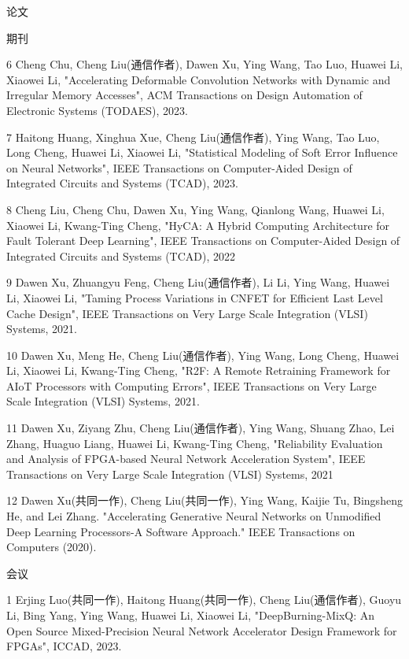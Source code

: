 \documentclass{resume} %
\begin{document}
\begin{rSection}{论文}
\begin{rSubsection} {期刊}{}{}{}
    \item 6 Cheng Chu, Cheng Liu(通信作者), Dawen Xu, Ying Wang, Tao Luo, Huawei Li, Xiaowei Li, "Accelerating Deformable Convolution Networks with Dynamic and Irregular Memory Accesses", ACM Transactions on Design Automation of Electronic Systems (TODAES), 2023.

    \item 7 Haitong Huang, Xinghua Xue, Cheng Liu(通信作者), Ying Wang, Tao Luo, Long Cheng, Huawei Li, Xiaowei Li, "Statistical Modeling of Soft Error Influence on Neural Networks", IEEE Transactions on Computer-Aided Design of Integrated Circuits and Systems (TCAD), 2023.

    \item 8 Cheng Liu, Cheng Chu, Dawen Xu, Ying Wang, Qianlong Wang, Huawei Li, Xiaowei Li, Kwang-Ting Cheng, "HyCA: A Hybrid Computing Architecture for Fault Tolerant Deep Learning", IEEE Transactions on Computer-Aided Design of Integrated Circuits and Systems (TCAD), 2022

    \item 9 Dawen Xu, Zhuangyu Feng, Cheng Liu(通信作者), Li Li, Ying Wang, Huawei Li, Xiaowei Li, "Taming Process Variations in CNFET for Efficient Last Level Cache Design", IEEE Transactions on Very Large Scale Integration (VLSI) Systems, 2021.

    \item 10 Dawen Xu, Meng He, Cheng Liu(通信作者), Ying Wang, Long Cheng, Huawei Li, Xiaowei Li, Kwang-Ting Cheng, "R2F: A Remote Retraining Framework for AIoT Processors with Computing Errors", IEEE Transactions on Very Large Scale Integration (VLSI) Systems, 2021.

    \item 11 Dawen Xu, Ziyang Zhu, Cheng Liu(通信作者), Ying Wang, Shuang Zhao, Lei Zhang, Huaguo Liang, Huawei Li, Kwang-Ting Cheng, "Reliability Evaluation and Analysis of FPGA-based Neural Network Acceleration System", IEEE Transactions on Very Large Scale Integration (VLSI) Systems, 2021

    \item 12 Dawen Xu(共同一作), Cheng Liu(共同一作), Ying Wang, Kaijie Tu, Bingsheng He, and Lei Zhang. "Accelerating Generative Neural Networks on Unmodified Deep Learning Processors-A Software Approach." IEEE Transactions on Computers (2020).

    \end{rSubsection}

    \begin{rSubsection} {会议}{}{}{}
    \item 1 Erjing Luo(共同一作), Haitong Huang(共同一作), Cheng Liu(通信作者), Guoyu Li, Bing Yang, Ying Wang, Huawei Li, Xiaowei Li, "DeepBurning-MixQ: An Open Source Mixed-Precision Neural Network Accelerator Design Framework for FPGAs", ICCAD, 2023.


\end{rSubsection}
\end{rSection}
\end{document}
